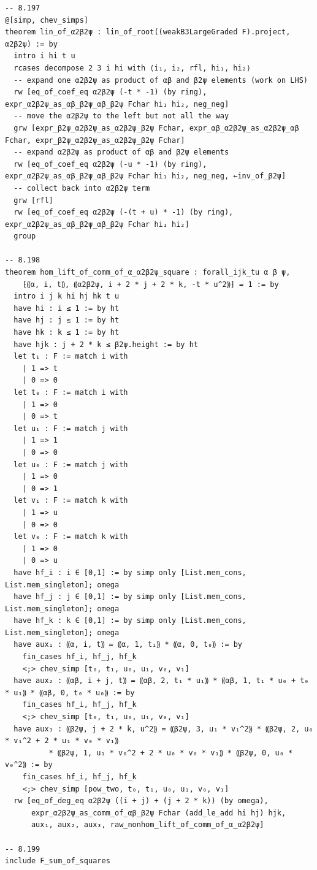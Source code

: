 \documentclass[10pt,a4paper]{article}
\begin{document}
\begin{Verbatim}
-- 8.197
@[simp, chev_simps]
theorem lin_of_α2β2ψ : lin_of_root((weakB3LargeGraded F).project, α2β2ψ) := by
  intro i hi t u
  rcases decompose 2 3 i hi with ⟨i₁, i₂, rfl, hi₁, hi₂⟩
  -- expand one α2β2ψ as product of αβ and β2ψ elements (work on LHS)
  rw [eq_of_coef_eq α2β2ψ (-t * -1) (by ring), expr_α2β2ψ_as_αβ_β2ψ_αβ_β2ψ Fchar hi₁ hi₂, neg_neg]
  -- move the α2β2ψ to the left but not all the way
  grw [expr_β2ψ_α2β2ψ_as_α2β2ψ_β2ψ Fchar, expr_αβ_α2β2ψ_as_α2β2ψ_αβ Fchar, expr_β2ψ_α2β2ψ_as_α2β2ψ_β2ψ Fchar]
  -- expand α2β2ψ as product of αβ and β2ψ elements
  rw [eq_of_coef_eq α2β2ψ (-u * -1) (by ring), expr_α2β2ψ_as_αβ_β2ψ_αβ_β2ψ Fchar hi₁ hi₂, neg_neg, ←inv_of_β2ψ]
  -- collect back into α2β2ψ term
  grw [rfl]
  rw [eq_of_coef_eq α2β2ψ (-(t + u) * -1) (by ring), expr_α2β2ψ_as_αβ_β2ψ_αβ_β2ψ Fchar hi₁ hi₂]
  group

-- 8.198
theorem hom_lift_of_comm_of_α_α2β2ψ_square : forall_ijk_tu α β ψ,
    ⁅⸨α, i, t⸩, ⸨α2β2ψ, i + 2 * j + 2 * k, -t * u^2⸩⁆ = 1 := by
  intro i j k hi hj hk t u
  have hi : i ≤ 1 := by ht
  have hj : j ≤ 1 := by ht
  have hk : k ≤ 1 := by ht
  have hjk : j + 2 * k ≤ β2ψ.height := by ht
  let t₁ : F := match i with
    | 1 => t
    | 0 => 0
  let t₀ : F := match i with
    | 1 => 0
    | 0 => t
  let u₁ : F := match j with
    | 1 => 1
    | 0 => 0
  let u₀ : F := match j with
    | 1 => 0
    | 0 => 1
  let v₁ : F := match k with
    | 1 => u
    | 0 => 0
  let v₀ : F := match k with
    | 1 => 0
    | 0 => u
  have hf_i : i ∈ [0,1] := by simp only [List.mem_cons, List.mem_singleton]; omega
  have hf_j : j ∈ [0,1] := by simp only [List.mem_cons, List.mem_singleton]; omega
  have hf_k : k ∈ [0,1] := by simp only [List.mem_cons, List.mem_singleton]; omega
  have aux₁ : ⸨α, i, t⸩ = ⸨α, 1, t₁⸩ * ⸨α, 0, t₀⸩ := by
    fin_cases hf_i, hf_j, hf_k
    <;> chev_simp [t₀, t₁, u₀, u₁, v₀, v₁]
  have aux₂ : ⸨αβ, i + j, t⸩ = ⸨αβ, 2, t₁ * u₁⸩ * ⸨αβ, 1, t₁ * u₀ + t₀ * u₁⸩ * ⸨αβ, 0, t₀ * u₀⸩ := by
    fin_cases hf_i, hf_j, hf_k
    <;> chev_simp [t₀, t₁, u₀, u₁, v₀, v₁]
  have aux₃ : ⸨β2ψ, j + 2 * k, u^2⸩ = ⸨β2ψ, 3, u₁ * v₁^2⸩ * ⸨β2ψ, 2, u₀ * v₁^2 + 2 * u₁ * v₀ * v₁⸩
          * ⸨β2ψ, 1, u₁ * v₀^2 + 2 * u₀ * v₀ * v₁⸩ * ⸨β2ψ, 0, u₀ * v₀^2⸩ := by
    fin_cases hf_i, hf_j, hf_k
    <;> chev_simp [pow_two, t₀, t₁, u₀, u₁, v₀, v₁]
  rw [eq_of_deg_eq α2β2ψ ((i + j) + (j + 2 * k)) (by omega),
      expr_α2β2ψ_as_comm_of_αβ_β2ψ Fchar (add_le_add hi hj) hjk,
      aux₁, aux₂, aux₃, raw_nonhom_lift_of_comm_of_α_α2β2ψ]

-- 8.199
include F_sum_of_squares


\end{Verbatim}
\end{document}
